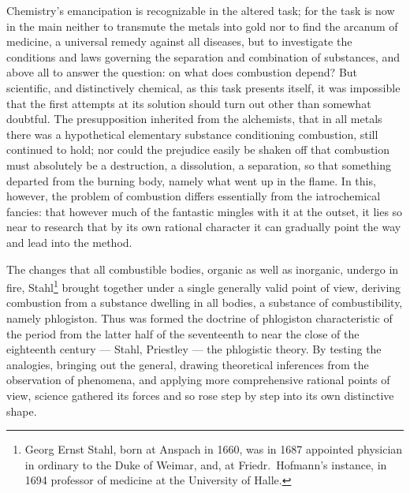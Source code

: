 \documentclass[12pt,a4paper]{book}
\begin{document}
Chemistry's emancipation is recognizable in the altered task; for the task is
now in the main neither to transmute the metals into gold nor to find the
arcanum of medicine, a universal remedy against all diseases, but to
investigate the conditions and laws governing the separation and combination of
substances, and above all to answer the question: on what does combustion
depend? But scientific, and distinctively chemical, as this task presents
itself, it was impossible that the first attempts at its solution should turn
out other than somewhat doubtful. The presupposition inherited from the
alchemists, that in all metals there was a hypothetical elementary substance
conditioning combustion, still continued to hold; nor could the prejudice
easily be shaken off that combustion must absolutely be a destruction, a
dissolution, a separation, so that something departed from the burning body,
\setcounter{footnote}{0}
namely what went up in the flame. In this, however, the problem of combustion
differs essentially from the iatrochemical
fancies: that however much of the fantastic mingles with it at the outset, it
lies so near to research that by its own rational character it can gradually
point the way and lead into the method.

The changes that all combustible bodies, organic as well as inorganic, undergo
in fire, Stahl\footnote{Georg Ernst Stahl, born at Anspach in 1660, was in
1687 appointed physician in ordinary to the Duke of Weimar, and, at
Friedr.\ Hofmann's instance, in 1694 professor of medicine at the
University of Halle.} brought together under a single generally
valid point of view, deriving combustion from a substance dwelling in all
bodies, a substance of combustibility, namely phlogiston. Thus was formed the
doctrine of phlogiston characteristic of the period from the latter half of the
seventeenth to near the close of the eighteenth century --- Stahl, Priestley
--- the phlogistic theory. By testing the analogies, bringing out the general,
drawing theoretical inferences from the observation of phenomena, and applying
more comprehensive rational points of view, science gathered its forces and so
rose step by step into its own distinctive shape.
\end{document}
